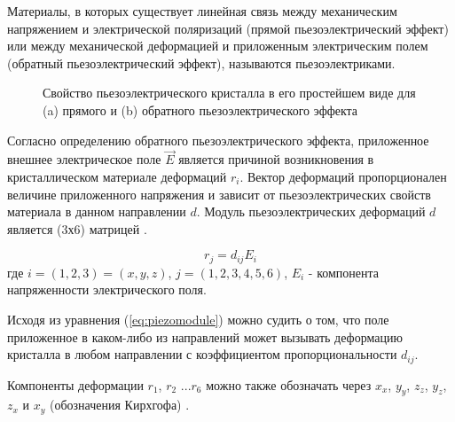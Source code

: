 \label{sec:piezo_theor}
Материалы, в которых  существует линейная связь между механическим напряжением
и электрической поляризаций (прямой пьезоэлектрический эффект) или между
механической деформацией и приложенным электрическим полем
(обратный пьезоэлектрический эффект), называются пьезоэлектриками.

\begin{figure}[H]
  \centering
  \hfill
  \caption{Свойство пьезоэлектрического кристалла в его простейшем виде для (a)
   прямого и (b) обратного пьезоэлектрического эффекта}
  \label{ris:piezo_is}
\end{figure}

Согласно определению обратного пьезоэлектрического эффекта,
приложенное внешнее электрическое поле $\vec{E}$ является причиной возникновения
в кристаллическом материале деформаций $r_i$. Вектор деформаций пропорционален
величине приложенного напряжения и зависит от пьезоэлектрических свойств материала
в данном направлении $d$. Модуль пьезоэлектрических деформаций $d$ является (3х6)
матрицей \cite{kedi_1949,Newnham_2005}.


\begin{equation}
  r_j = d_{ij}E_i
  \label{eq:piezomodule}
\end{equation}
где $i = (1,2,3) = (x,y,z)$, $j = (1,2,3,4,5,6)$, $E_i$ - компонента напряженности электрического поля.

Исходя из уравнения (\ref{eq:piezomodule}) можно судить о том, что поле приложенное в каком-либо из
направлений может вызывать деформацию кристалла в любом направлении с коэффициентом пропорциональности $d_{ij}$.

Компоненты деформации  $r_1$, $r_2$ ...$r_6$ можно также обозначать  через $x_x$, $y_y$, $z_z$,
$y_z$, $z_x$ и $x_y$ (обозначения Кирхгофа)  \cite{kedi_1949}.

